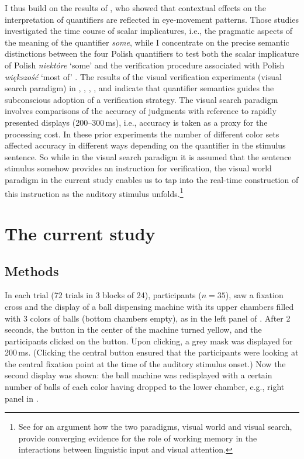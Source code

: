 \documentclass[output=paper]{langscibook}
\begin{document}
I thus build on the results of \citet{huang2009online, huang2011logic, grodner2010some, degen2011making, degen2016availability}, who showed that contextual effects on the interpretation of quantifiers are reflected in eye-movement patterns. Those
studies investigated the time course of scalar implicatures, i.e., the pragmatic aspects of the meaning of the quantifier
\textit{some}, while I concentrate on the precise semantic distinctions between the four Polish quantifiers to test
both the scalar implicature of Polish \textit{niektóre} `some' \citep{spychalska-msc} and the verification procedure associated
with Polish \textit{większość} `most of' \citep{szymanik2010comprehension}. The results of the visual verification experiments (visual search
paradigm) in 
\citet{pietroski2009meaning}, \citet{lidz2011interface}, \citet{tomaszewicz2011verification, tomaszewicz2012semantics, tomaszewicz2013linguistic}, \citet{hunter2017verification}, and \citet{Knowlton2021} indicate that quantifier
semantics guides the subconscious adoption of a verification strategy. The visual search paradigm involves comparisons
of the accuracy of judgments with reference to rapidly presented displays (200--300\,ms), i.e., accuracy is taken as a
proxy for the processing cost. In these prior experiments the number of different color sets affected accuracy in different
ways depending on the quantifier in the stimulus sentence. So while in the visual search paradigm it is assumed that
the sentence stimulus somehow provides an instruction for verification, the visual world paradigm in the current
study enables us to tap into the real-time construction of this instruction as the auditory stimulus unfolds.\footnote{See
\citet{huettig2011looking} for an argument how the two paradigms, visual world and visual search, provide converging evidence
for the role of working memory in the interactions between linguistic input and visual attention.}





\section{The current study} 
\subsection{Methods} \label{tom:Methods}

In each trial (72 trials in 3 blocks of 24), participants ($n=35$), saw a fixation cross and the display of a
ball dispensing machine with its upper chambers filled with 3 colors of balls (bottom chambers empty), as in the left panel of . After 2 seconds, the button in the center of the machine turned yellow, and the participants clicked on the
button. Upon clicking, a grey mask was displayed for 200\,ms. (Clicking the central button ensured that the participants were
looking at the central fixation point at the time of the auditory stimulus onset.) Now the second display was shown: the
ball machine was redisplayed with a certain number of balls of each color having dropped to the lower chamber,
e.g., right panel in . 
\end{document}
